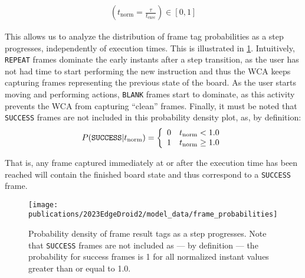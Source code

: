 \begin{align}
    \left( t_\text{norm} = \frac{\tau}{t_\text{exec}} \right) \in [0, 1]\label{eq:tnorm}
\end{align}


This allows us to analyze the distribution of frame tag probabilities as a step progresses, independently of execution times.
This is illustrated in \cref{fig:frameprobs}.
Intuitively, \texttt{REPEAT} frames dominate the early instants after a step transition, as the user has not had time to start performing the new instruction and thus the \gls{WCA} keeps capturing frames representing the previous state of the board.
As the user starts moving and performing actions, \texttt{BLANK} frames start to dominate, as this activity prevents the \gls{WCA} from capturing ``clean'' frames.
Finally, it must be noted that \texttt{SUCCESS} frames are not included in this probability density plot, as, by definition:
\begin{equation}
    P(\text{\texttt{SUCCESS}} | t_\text{norm}) =
    \left\{ \begin{array}{ll}
        0 & t_\text{norm} < 1.0    \\
        1 & t_\text{norm} \geq 1.0
    \end{array} \right.
\end{equation}

That is, any frame captured immediately at or after the execution time has been reached will contain the finished board state and thus correspond to a \texttt{SUCCESS} frame.

\begin{figure}
    \centering
    \texttt{[image: publications/2023EdgeDroid2/model\_data/frame\_probabilities]}
    \caption{%
        Probability density of frame result tags as a step progresses.
        Note that \texttt{SUCCESS} frames are not included as --- by definition --- the probability for success frames is \num{1} for all normalized instant values greater than or equal to \num{1.0}.
    }\label{fig:frameprobs}
\end{figure}

